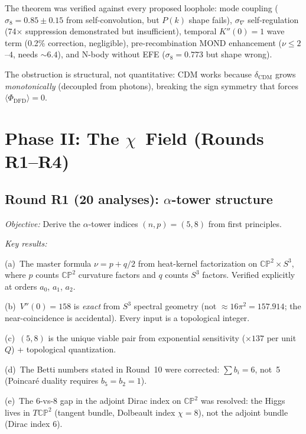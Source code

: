 \documentclass[aps,prd,twocolumn,superscriptaddress,nofootinbib]{revtex4-2}
\newcommand{\CP}{\mathbb{CP}}
\newcommand{\Sph}{S}
\begin{document}
The theorem was verified against every proposed loophole:
mode coupling ($\sigma_8 = 0.85\pm 0.15$ from
self-convolution, but $P(k)$ shape fails), $\sigma_\nabla$
self-regulation (74$\times$ suppression demonstrated but
insufficient), temporal $K''(0)=1$ wave term (0.2\%
correction, negligible), pre-recombination MOND
enhancement ($\nu \leq 2$--$4$, needs ${\sim}6.4$),
and N-body without EFE ($\sigma_8 = 0.773$ but shape
wrong).

The obstruction is structural, not quantitative: CDM
works because $\delta_{\mathrm{CDM}}$ grows
\emph{monotonically} (decoupled from photons), breaking
the sign symmetry that forces
$\langle\Phi_{\mathrm{DFD}}\rangle = 0$.

\section{Phase II: The $\chi$~Field (Rounds R1--R4)}
\label{sec:phase2}

\subsection{Round R1 (20 analyses): $\alpha$-tower
structure}

\emph{Objective:} Derive the $\alpha$-tower indices
$(n,p)=(5,8)$ from first principles.

\emph{Key results:}

(a)~The master formula $\nu = p + q/2$ from heat-kernel
factorization on $\CP^2\times\Sph^3$, where $p$ counts
$\CP^2$ curvature factors and $q$ counts $\Sph^3$
factors. Verified explicitly at orders $a_0$, $a_1$,
$a_2$.

(b)~$V''(0) = 158$ is \emph{exact} from $\Sph^3$
spectral geometry (not $\approx 16\pi^2 = 157.914$;
the near-coincidence is accidental). Every input is a
topological integer.

(c)~$(5,8)$ is the unique viable pair from
exponential sensitivity ($\times 137$ per unit $Q$) +
topological quantization.

(d)~The Betti numbers stated in Round~10 were corrected:
$\sum b_i = 6$, not~5 (Poincar\'e duality requires
$b_5 = b_2 = 1$).

(e)~The 6-vs-8 gap in the adjoint Dirac index on $\CP^2$
was resolved: the Higgs lives in $T\CP^2$ (tangent
bundle, Dolbeault index $\chi = 8$), not the adjoint
bundle (Dirac index 6).
\end{document}
